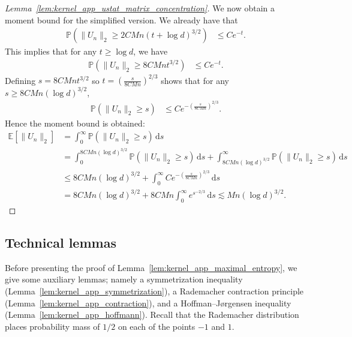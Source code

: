 \documentclass[11pt,lof]{puthesis}
\renewcommand{\P}{\ensuremath{\mathbb{P}}}
\newcommand{\E}{\ensuremath{\mathbb{E}}}
\newcommand{\diff}[1]{\,\mathrm{d}#1}
\theoremstyle{break}
\theoremstyle{proof}
\newtheorem{proof}{Proof}
\begin{document}
\begin{proof}[Lemma~\ref{lem:kernel_app_ustat_matrix_concentration}]
  We now obtain a moment bound for the simplified version.
  We already have that
  \begin{align*}
    \P\left(
      \|U_n\|_2
      \geq
      2 C M n
      (t + \log d)^{3/2}
    \right)
    &\leq
    C e^{-t}.
  \end{align*}
  This implies that for any $t \geq \log d$,
  we have
  \begin{align*}
    \P\left(
      \|U_n\|_2
      \geq
      8 C M n
      t^{3/2}
    \right)
    &\leq
    C e^{-t}.
  \end{align*}
  Defining $s = 8 C M n t^{3/2}$ so $t = \left( \frac{s}{8C M n} \right)^{2/3}$
  shows that for any $s \geq 8C M n(\log d)^{3/2}$,
  \begin{align*}
    \P\left(
      \|U_n\|_2
      \geq
      s
    \right)
    &\leq
    C e^{-\left( \frac{s}{8C M n} \right)^{2/3}}.
  \end{align*}
  Hence the moment bound is obtained:
  \begin{align*}
    \E\left[
      \|U_n\|_2
    \right]
    &=
    \int_0^\infty
    \P\left(
      \|U_n\|_2
      \geq
      s
    \right)
    \diff{s} \\
    &=
    \int_0^{8C M n(\log d)^{3/2}}
    \P\left(
      \|U_n\|_2
      \geq
      s
    \right)
    \diff{s}
    +
    \int_{8C M n(\log d)^{3/2}}^\infty
    \P\left(
      \|U_n\|_2
      \geq
      s
    \right)
    \diff{s} \\
    &\leq
    8C M n(\log d)^{3/2}
    +
    \int_0^\infty
    C e^{-\left( \frac{s}{8C M n} \right)^{2/3}}
    \diff{s} \\
    &=
    8C M n(\log d)^{3/2}
    +
    8C M n
    \int_0^\infty
    e^{s^{-2/3}}
    \diff{s}
    \lesssim
    Mn(\log d)^{3/2}.
  \end{align*}
\end{proof}

\subsection{Technical lemmas}

Before presenting the proof of
Lemma~\ref{lem:kernel_app_maximal_entropy},
we give some auxiliary lemmas;
namely a symmetrization inequality
(Lemma~\ref{lem:kernel_app_symmetrization}),
a Rademacher contraction principle
(Lemma~\ref{lem:kernel_app_contraction}),
and a Hoffman--J{\o}rgensen inequality
(Lemma~\ref{lem:kernel_app_hoffmann}).
Recall that the Rademacher distribution
places probability mass of $1/2$
on each of the points $-1$ and $1$.
\end{document}

